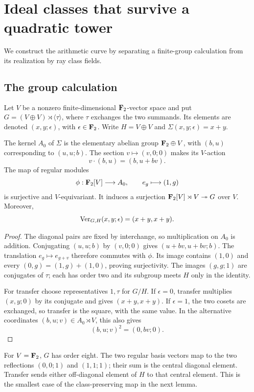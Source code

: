 \section{Ideal classes that survive a quadratic tower}
We construct the arithmetic curve by separating a finite-group
calculation from its realization by ray class fields.

\subsection{The group calculation}
Let $V$ be a nonzero finite-dimensional $\mathbf F_2$-vector space and put
$G=(V\oplus V)\rtimes\langle\tau\rangle$, where $\tau$ exchanges the
two summands. Its elements are denoted $(x,y;\epsilon)$, with
$\epsilon\in\mathbf F_2$. Write $H=V\oplus V$ and
$\Sigma(x,y;\epsilon)=x+y$.

\begin{lemma}\label{lem:wreath}
The kernel $A_0$ of $\Sigma$ is the elementary abelian group
$\mathbf F_2\oplus V$, with $(b,u)$ corresponding to $(u,u;b)$.
The section $v\mapsto(v,0;0)$ makes its $V$-action
\[
 v\cdot(b,u)=(b,u+bv).
\]
The map of regular modules
\[
 \phi:\mathbf F_2[V]\longrightarrow A_0,\qquad e_g\longmapsto(1,g)
\]
is surjective and $V$-equivariant. It induces a surjection
$\mathbf F_2[V]\rtimes V\twoheadrightarrow G$ over $V$. Moreover,
\[
 \operatorname{Ver}_{G,H}(x,y;\epsilon)=(x+y,x+y).
\]
\end{lemma}
\begin{proof}
The diagonal pairs are fixed by interchange, so multiplication on
$A_0$ is addition. Conjugating $(u,u;b)$ by $(v,0;0)$ gives
$(u+bv,u+bv;b)$. The translation $e_g\mapsto e_{g+v}$ therefore
commutes with $\phi$. Its image contains $(1,0)$ and every
$(0,g)=(1,g)+(1,0)$, proving surjectivity. The images $(g,g;1)$
are conjugates of $\tau$; each has order two and its subgroup meets
$H$ only in the identity.

For transfer choose representatives $1,\tau$ for $G/H$. If
$\epsilon=0$, transfer multiplies $(x,y;0)$ by its conjugate and
gives $(x+y,x+y)$. If $\epsilon=1$, the two cosets are exchanged,
so transfer is the square, with the same value. In the alternative
coordinates $(b,u;v)\in A_0\rtimes V$, this also gives
\begin{equation}\label{eq:square}
 (b,u;v)^2=(0,bv;0).
\end{equation}
\end{proof}

For $V=\mathbf F_2$, $G$ has order eight. The two regular basis vectors
map to the two reflections $(0,0;1)$ and $(1,1;1)$; their sum is
the central diagonal element. Transfer sends either off-diagonal
element of $H$ to that central element. This is the smallest case
of the class-preserving map in the next lemma.

